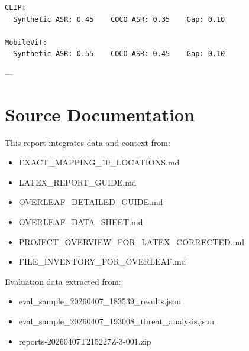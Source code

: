 \documentclass[11pt]{article}
\begin{document}
\begin{verbatim}
CLIP:
  Synthetic ASR: 0.45    COCO ASR: 0.35    Gap: 0.10

MobileViT:
  Synthetic ASR: 0.55    COCO ASR: 0.45    Gap: 0.10
\end{verbatim}

---

\section{Source Documentation}

This report integrates data and context from:

\begin{itemize}[leftmargin=2em]
    \item EXACT\_MAPPING\_10\_LOCATIONS.md
    \item LATEX\_REPORT\_GUIDE.md
    \item OVERLEAF\_DETAILED\_GUIDE.md
    \item OVERLEAF\_DATA\_SHEET.md
    \item PROJECT\_OVERVIEW\_FOR\_LATEX\_CORRECTED.md
    \item FILE\_INVENTORY\_FOR\_OVERLEAF.md
\end{itemize}

Evaluation data extracted from:
\begin{itemize}[leftmargin=2em]
    \item eval\_sample\_20260407\_183539\_results.json
    \item eval\_sample\_20260407\_193008\_threat\_analysis.json
    \item reports-20260407T215227Z-3-001.zip
\end{itemize}
\end{document}

